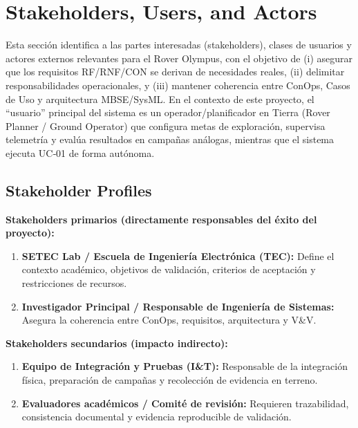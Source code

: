 
\section{Stakeholders, Users, and Actors}

Esta sección identifica a las partes interesadas (stakeholders), clases de usuarios y actores externos relevantes para el Rover Olympus, con el objetivo de (i) asegurar que los requisitos RF/RNF/CON se derivan de necesidades reales, (ii) delimitar responsabilidades operacionales, y (iii) mantener coherencia entre ConOps, Casos de Uso y arquitectura MBSE/SysML. \cite{omg_sysml_mbse, nasa_cm, segoldmine_ppi}  
En el contexto de este proyecto, el ``usuario'' principal del sistema es un operador/planificador en Tierra (Rover Planner / Ground Operator) que configura metas de exploración, supervisa telemetría y evalúa resultados en campañas análogas, mientras que el sistema ejecuta UC‑01 de forma autónoma. \cite{nasa_cm, segoldmine_ppi, omg_sysml_mbse}  

\subsection{Stakeholder Profiles}

\textbf{Stakeholders primarios (directamente responsables del éxito del proyecto):}
\begin{enumerate}
    \item \textbf{SETEC Lab / Escuela de Ingeniería Electrónica (TEC):} Define el contexto académico, objetivos de validación, criterios de aceptación y restricciones de recursos. \cite{nasa_cm, segoldmine_ppi}  
    \item \textbf{Investigador Principal / Responsable de Ingeniería de Sistemas:} Asegura la coherencia entre ConOps, requisitos, arquitectura y V\&V. \cite{nasa_cm, segoldmine_ppi}  
\end{enumerate}

\textbf{Stakeholders secundarios (impacto indirecto):}
\begin{enumerate}[resume]
    \item \textbf{Equipo de Integración y Pruebas (I\&T):} Responsable de la integración física, preparación de campañas y recolección de evidencia en terreno. \cite{segoldmine_ppi, nasa_cm}  
    \item \textbf{Evaluadores académicos / Comité de revisión:} Requieren trazabilidad, consistencia documental y evidencia reproducible de validación. \cite{omg_sysml_mbse, segoldmine_ppi}  
\end{enumerate}

